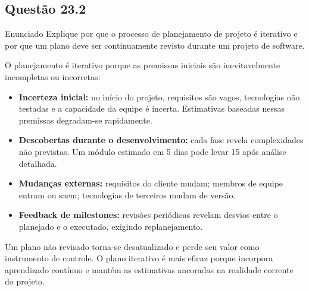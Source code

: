 \documentclass[12pt,a4paper]{article}
\begin{document}
\subsection*{Questão 23.2}
\begin{questao}{Enunciado}
Explique por que o processo de planejamento de projeto é iterativo e por que
um plano deve ser continuamente revisto durante um projeto de software.
\end{questao}
\begin{resposta}
O planejamento é iterativo porque as premissas iniciais são inevitavelmente
incompletas ou incorretas:

\begin{itemize}[nosep]
  \item \textbf{Incerteza inicial:} no início do projeto, requisitos são
        vagos, tecnologias não testadas e a capacidade da equipe é incerta.
        Estimativas baseadas nessas premissas degradam-se rapidamente.
  \item \textbf{Descobertas durante o desenvolvimento:} cada fase revela
        complexidades não previstas. Um módulo estimado em 5 dias pode levar
        15 após análise detalhada.
  \item \textbf{Mudanças externas:} requisitos do cliente mudam; membros de
        equipe entram ou saem; tecnologias de terceiros mudam de versão.
  \item \textbf{Feedback de milestones:} revisões periódicas revelam desvios
        entre o planejado e o executado, exigindo replanejamento.
\end{itemize}

Um plano não revisado torna-se desatualizado e perde seu valor como
instrumento de controle. O plano iterativo é mais eficaz porque incorpora
aprendizado contínuo e mantém as estimativas ancoradas na realidade corrente
do projeto.
\end{resposta}

\end{document}
